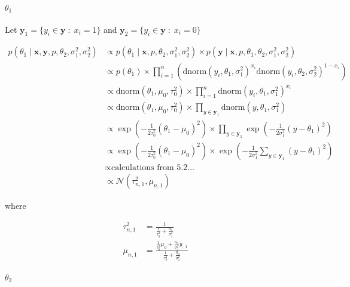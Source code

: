\documentclass[]{article}
\let\oldparagraph\paragraph
\renewcommand{\paragraph}[1]{\oldparagraph{#1}\mbox{}}
\begin{document}
\hypertarget{theta_1}{%
\paragraph{\texorpdfstring{\(\theta_1\)}{\textbackslash{}theta\_1}}\label{theta_1}}

Let \(\boldsymbol{y}_1 = \{y_i \in \boldsymbol{y} \; : \; x_i = 1 \}\)
and \(\boldsymbol{y}_2 = \{y_i \in \boldsymbol{y} \; : \; x_i = 0 \}\)

\[
\begin{align}
p(\theta_1 \mid \boldsymbol{x}, \boldsymbol{y}, p, \theta_2, \sigma^2_1, \sigma^2_2) &\propto p(\theta_1 \mid \boldsymbol{x}, p, \theta_2, \sigma^2_1, \sigma^2_2) \times p(\boldsymbol{y} \mid \boldsymbol{x}, p, \theta_1, \theta_2, \sigma^2_1, \sigma^2_2) \\
&\propto p(\theta_1) \times \prod_{i=1}^n \left( \text{dnorm}(y_i, \theta_1, \sigma^2_1)^{x_i} \text{dnorm}(y_i, \theta_2, \sigma^2_2)^{1 - x_i} \right) \\
&\propto \text{dnorm}(\theta_1, \mu_0, \tau^2_0) \times \prod_{i = 1}^n \text{dnorm}(y_i, \theta_1, \sigma^2_1)^{x_i} \\
&\propto \text{dnorm}(\theta_1, \mu_0, \tau^2_0) \times \prod_{y \in \boldsymbol{y}_1} \text{dnorm}(y, \theta_1, \sigma^2_1) \\
&\propto \exp \left(- \frac{1}{2 \tau^2_0} (\theta_1 - \mu_0)^2 \right) \times \prod_{y \in \boldsymbol{y}_1} \exp\left( -\frac{1}{2\sigma^2_1} (y - \theta_1)^2\right) \\
&\propto \exp \left(- \frac{1}{2 \tau^2_0} (\theta_1 - \mu_0)^2 \right) \times \exp\left(-\frac{1}{2\sigma^2_1} \sum_{y \in \boldsymbol{y}_1} (y - \theta_1)^2 \right) \\
&\propto \text{calculations from 5.2...} \\
&\propto \mathcal{N}(\tau^2_{n , 1}, \mu_{n, 1})
\end{align}
\]

where

\[
\begin{align}
\tau^2_{n, 1} &= \frac{1}{\frac{1}{\tau^2_0} + \frac{n_1}{\sigma^2_1}} \\
\mu_{n, 1} &= \frac{\frac{1}{\tau^2_0}\mu_0 + \frac{n_1}{\sigma^2_1} \bar{y}_{\cdot, 1}}{\frac{1}{\tau^2_0} + \frac{n_1}{\sigma^2_1}}
\end{align}
\]

\hypertarget{theta_2}{%
\paragraph{\texorpdfstring{\(\theta_2\)}{\textbackslash{}theta\_2}}\label{theta_2}}
\end{document}
